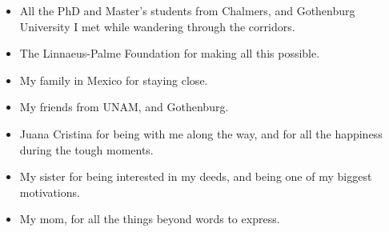 \documentclass[letterpaper,12pt,oneside]{book}
\begin{document}
\begin{itemize}
\item All the PhD and Master's students from Chalmers, and Gothenburg University I met while wandering through the corridors. 
\item The Linnaeus-Palme Foundation for making all this possible.
\item My family in Mexico for staying close.
\item My friends from UNAM, and Gothenburg.
\item Juana Cristina for being with me along the way, and for all the happiness during the tough moments.
\item My sister for being interested in my deeds, and being one of my biggest motivations.
\item My mom, for all the things beyond words to express. 

\end{itemize}



\tableofcontents

    
\mainmatter
\end{document}

